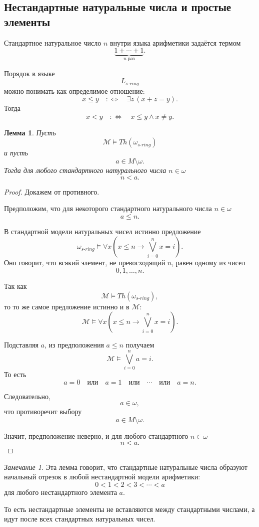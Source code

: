 \documentclass[12pt,a4paper,oneside,openany]{book}
\theoremstyle{definition}
\theoremstyle{plain}
\newtheorem{lemma}{Лемма}[chapter]
\theoremstyle{remark}
\newtheorem{remark}{Замечание}[chapter]
\begin{document}
\subsection{Нестандартные натуральные числа и простые элементы}


Стандартное натуральное число \(n\) внутри языка арифметики задаётся термом
\[
\underbrace{1+\cdots+1}_{n\text{ раз}}.
\]

Порядок в языке
\[
L_{s\text{-}ring}
\]
можно понимать как определимое отношение:
\[
x\le y
\quad:\Longleftrightarrow\quad
\exists z\,(x+z=y).
\]
Тогда
\[
x<y
\quad:\Longleftrightarrow\quad
x\le y\wedge x\ne y.
\]

\begin{lemma}
Пусть
\[
\mathcal M\models Th(\omega_{s\text{-}ring})
\]
и пусть
\[
a\in M\setminus\omega.
\]
Тогда для любого стандартного натурального числа \(n\in\omega\)
\[
n<a.
\]
\end{lemma}

\begin{proof}
Докажем от противного.

Предположим, что для некоторого стандартного натурального числа \(n\in\omega\)
\[
a\le n.
\]

В стандартной модели натуральных чисел истинно предложение
\[
\omega_{s\text{-}ring}
\models
\forall x
\left(
x\le n
\to
\bigvee_{i=0}^{n}x=i
\right).
\]
Оно говорит, что всякий элемент, не превосходящий \(n\), равен одному из чисел
\[
0,1,\ldots,n.
\]

Так как
\[
\mathcal M\models Th(\omega_{s\text{-}ring}),
\]
то то же самое предложение истинно и в \(\mathcal M\):
\[
\mathcal M
\models
\forall x
\left(
x\le n
\to
\bigvee_{i=0}^{n}x=i
\right).
\]

Подставляя \(a\), из предположения \(a\le n\) получаем
\[
\mathcal M\models \bigvee_{i=0}^{n}a=i.
\]
То есть
\[
a=0
\quad\text{или}\quad
a=1
\quad\text{или}\quad
\cdots
\quad\text{или}\quad
a=n.
\]

Следовательно,
\[
a\in\omega,
\]
что противоречит выбору
\[
a\in M\setminus\omega.
\]

Значит, предположение неверно, и для любого стандартного \(n\in\omega\)
\[
n<a.
\]
\end{proof}

\begin{remark}
Эта лемма говорит, что стандартные натуральные числа образуют начальный отрезок в любой нестандартной модели арифметики:
\[
0<1<2<3<\cdots<a
\]
для любого нестандартного элемента \(a\).

То есть нестандартные элементы не вставляются между стандартными числами, а идут после всех стандартных натуральных чисел.
\end{remark}
\end{document}
